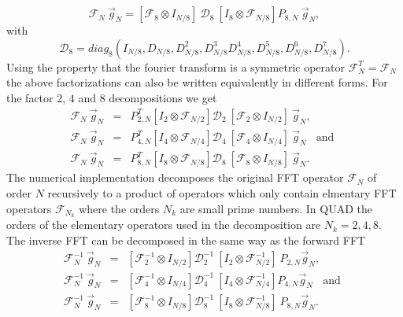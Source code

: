 \begin{equation}  \label{eq_FNFNr8}
 \mathcal{F}_{N} \ \vec{g}_{N} 
   = 
 \left[
  \mathcal{F}_{8} \otimes I_{N/8}
 \right] \ 
  \mathcal{D}_{8} \ 
 \left[
  I_{8} \otimes \mathcal{F}_{N/8}
 \right] 
 P_{8,N} \ \vec{g}_{N},
\end{equation}
with
\begin{equation}  \label{eq_FNFNr8def01}
 \mathcal{D}_{8} =  
 diag_{8} \left(I_{N/8},D_{N/8},D^{2}_{N/8},D^{3}_{N/8}
                D^{4}_{N/8},D^{5}_{N/8},D^{6}_{N/8},D^{7}_{N/8} \right).
\end{equation}
Using the property that the fourier transform is a symmetric operator 
$\mathcal{F}^{T}_{N} = \mathcal{F}_{N}$ the above factorizations can also 
be written equivalently in different forms. For the factor $2$, $4$ and 
$8$ decompositions we get
\begin{eqnarray}  \label{eq_FNFNr2_T}
 \mathcal{F}_{N} \ \vec{g}_{N}
  &=&
 P^{T}_{2,N} \left[I_{2} \otimes \mathcal{F}_{N/2} \right] 
 \mathcal{D}_{2} \ 
 \left[\mathcal{F}_{2} \otimes I_{N/2} \right] \ 
 \vec{g}_{N},
  \\ \label{eq_FNFNr4_T}
 \mathcal{F}_{N} \ \vec{g}_{N}
  &=&
 P^{T}_{4,N} \left[I_{4} \otimes \mathcal{F}_{N/4} \right] 
 \mathcal{D}_{4} \ 
 \left[\mathcal{F}_{4} \otimes I_{N/4} \right] \ 
 \vec{g}_{N}
 \ \ \ \ \mbox{and} \ \
  \\ \label{eq_FNFNr8_T}
 \mathcal{F}_{N} \ \vec{g}_{N}
  &=&
 P^{T}_{8,N} \left[I_{8} \otimes \mathcal{F}_{N/8} \right]
 \mathcal{D}_{8} \ 
 \left[\mathcal{F}_{8} \otimes I_{N/8} \right] \ 
 \vec{g}_{N}.
\end{eqnarray}
The numerical implementation decomposes the original FFT operator 
$\mathcal{F}_{N}$ of order $N$ recursively to a product of operators
which only contain elmentary FFT operators $\mathcal{F}_{N_{k}}$ 
where the orders $N_{k}$ are small prime numbers. In QUAD the orders 
of the elementary operators used in the decomposition are 
$N_{k} = 2,4,8$. The inverse FFT can be decomposed in the same way
as the forward FFT 
\begin{eqnarray}  \label{eq_FNFNr2_inverse}
 \mathcal{F}^{-1}_{N} \ \vec{g}_{N}
  &=&
 \left[\mathcal{F}^{-1}_{2} \otimes I_{N/2} \right]
 \mathcal{D}^{-1}_{2} \ 
 \left[I_{2} \otimes \mathcal{F}^{-1}_{N/2} \right] \
 P_{2,N}
 \vec{g}_{N},
  \\ \label{eq_FNFNr4_inverse}
 \mathcal{F}^{-1}_{N} \ \vec{g}_{N}
  &=&
 \left[\mathcal{F}^{-1}_{4} \otimes I_{N/4} \right]
 \mathcal{D}^{-1}_{4} \
 \left[I_{4} \otimes \mathcal{F}^{-1}_{N/4} \right] 
 P_{4,N}
 \vec{g}_{N}
 \ \ \ \ \mbox{and} \ \
  \\ \label{eq_FNFNr8_inverse}
 \mathcal{F}^{-1}_{N} \ \vec{g}_{N}
  &=&
 \left[\mathcal{F}^{-1}_{8} \otimes I_{N/8} \right]
 \mathcal{D}^{-1}_{8} \
 \left[I_{8} \otimes \mathcal{F}^{-1}_{N/8} \right] \
  P_{8,N}
 \vec{g}_{N}.
\end{eqnarray}
